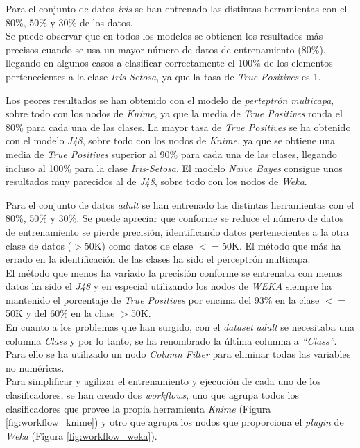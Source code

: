 \documentclass[10pt,a4paper]{article}
\begin{document}
Para el conjunto de datos \emph{iris} se han entrenado las distintas herramientas con el 80\%, 50\% y 30\% de los datos.\\ Se puede observar que en todos los modelos se obtienen los resultados más precisos cuando se usa un mayor número de datos de entrenamiento (80\%), llegando en algunos casos a clasificar correctamente el 100\% de los elementos pertenecientes a la clase \textit{Iris-Setosa}, ya que la tasa de \textit{True Positives} es 1.\par
Los peores resultados se han obtenido con el modelo de \textit{perteptrón multicapa}, sobre todo con los nodos de \textit{Knime}, ya que la media de \textit{True Positives} ronda el 80\% para cada una de las clases.
La mayor tasa de \textit{True Positives} se ha obtenido con el modelo \textit{J48}, sobre todo con los nodos de \textit{Knime}, ya que se obtiene una media de \textit{True Positives} superior al 90\% para cada una de las clases, llegando incluso al 100\% para la clase \textit{Iris-Setosa}. El modelo \textit{Naive Bayes} consigue unos resultados muy parecidos al de \textit{J48}, sobre todo con los nodos de \textit{Weka}.

Para el conjunto de datos \emph{adult} se han entrenado las distintas herramientas con el 80\%, 50\% y 30\%.
Se puede apreciar que conforme se reduce el número de datos de entrenamiento se pierde precisión, identificando datos pertenecientes a la otra clase de datos ($>$50K) como datos de clase $<=$50K. El método que más ha errado en la identificación de las clases ha sido el perceptrón multicapa.\\
El método que menos ha variado la precisión conforme se entrenaba con menos datos ha sido el \emph{J48} y en especial utilizando los nodos de \emph{WEKA} siempre ha mantenido el porcentaje de \emph{True Positives} por encima del 93\% en la clase $<=$50K y del 60\% en la clase $>$50K.\\

En cuanto a los problemas que han surgido, con el \emph{dataset} \emph{adult} se necesitaba una columna \emph{Class} y por lo tanto, se ha renombrado la última columna a \emph{``Class''}. Para ello se ha utilizado un nodo \emph{Column Filter} para eliminar todas las variables no numéricas.\\

Para simplificar y agilizar el entrenamiento y ejecución de cada uno de los clasificadores, se han creado dos \textit{workflows}, uno que agrupa todos los clasificadores que provee la propia herramienta \textit{Knime} (Figura \ref{fig:workflow_knime}) y otro que agrupa los nodos que proporciona el \textit{plugin} de \textit{Weka} (Figura \ref{fig:workflow_weka}).
\end{document}
